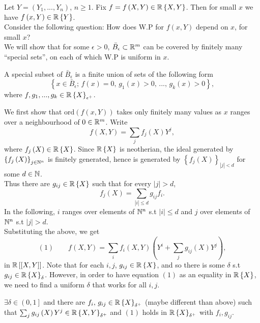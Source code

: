 Let $Y=\left(Y_{1},...,Y_{n}\right)$, $n\geq1$. Fix $f=f\left(X,Y\right)\in\mathbb{R}\left\{ X,Y\right\} $.
Then for small $x$ we have $f\left(x,Y\right)\in\mathbb{R}\left\{ Y\right\} $.\\
Consider the following question: How does W.P for $f\left(x,Y\right)$
depend on $x$, for small $x$?\\
We will show that for some $\epsilon>0$, $\bar{B}_{\epsilon}\subset\mathbb{R}^{m}$
can be covered by finitely many ``special sets'', on each of which
W.P is uniform in $x$.
\begin{defn*}
\label{11.6} A special subset of $\bar{B}_{\epsilon}$ is a finite union
of sets of the following form 
\[
\left\{ x\in\bar{B}_{\epsilon};\, f\left(x\right)=0,\, g_{1}\left(x\right)>0,\,...,\, g_{k}\left(x\right)>0\right\} ,
\]
where $f,g_{1},...,g_{k}\in\mathbb{R}\left\{ X\right\} _{\epsilon^{+}}$.
\end{defn*}
We first show that $\mathrm{ord}\left(f\left(x,Y\right)\right)$ takes
only finitely many values as $x$ ranges over a neighbourhood of $0\in\mathbb{R}^{m}$.
Write
\[
f\left(X,Y\right)=\sum_{j}f_{j}\left(X\right)Y^{j},
\]
where $f_{j}\left(X\right)\in\mathbb{R}\left\{ X\right\} $. Since $\mathbb{R}\left\{ X\right\} $
is neotherian, the ideal generated by $\left\{ f_{j}\left(X\right)\right\} _{j\in\mathbb{N}^{n}}$
is finitely generated, hence is generated by $\left\{ f_{j}\left(X\right)\right\} _{\left|j\right|<d}$
for some $d\in\mathbb{N}$. \\
Thus there are $g_{ij}\in\mathbb{R}\left\{ X\right\} $ such that for every
$\left|j\right|>d$,
\[
f_{j}\left(X\right)=\sum_{\left|i\right|\leq d}g_{ij}f_{i}.
\]
In the following, $i$ ranges over elements of $\mathbb{N}^{n}$ s.t $\left|i\right|\leq d$
and $j$ over elements of $\mathbb{N}^{n}$ s.t $\left|j\right|>d$. \\
Substituting the above, we get 
\[
\left(1\right)\qquad f\left(X,Y\right)=\sum_{i}f_{i}\left(X,Y\right)\left(Y^{i}+\sum_{j}g_{ij}\left(X\right)Y^{j}\right),
\]
in $\mathbb{R}\left[\left[X,Y\right]\right]$. Note that for each $i,j$,
$g_{ij}\in\mathbb{R}\left\{ X\right\} $, and so there is some $\delta$ s.t
$g_{ij}\in\mathbb{R}\left\{ X\right\} _{\delta}$. However, in order to have
equation $\left(1\right)$ as an equality in $\mathbb{R}\left\{ X\right\} $,
we need to find a uniform $\delta$ that works for all $i,j$.
\begin{claim*}
$\exists\delta\in\left(0,1\right]$ and there are $f_{i},\, g_{ij}\in\mathbb{R}\left\{ X\right\} _{\delta^{+}}$
(maybe different than above) such that $\sum_{j}g_{ij}\left(X\right)Y^{j}\in\mathbb{R}\left\{ X,Y\right\} _{\delta^{+}}$
and $\left(1\right)$ holds in $\mathbb{R}\left\{ X\right\} _{\delta^{+}}$
with $f_{i},g_{ij}$.\end{claim*}
